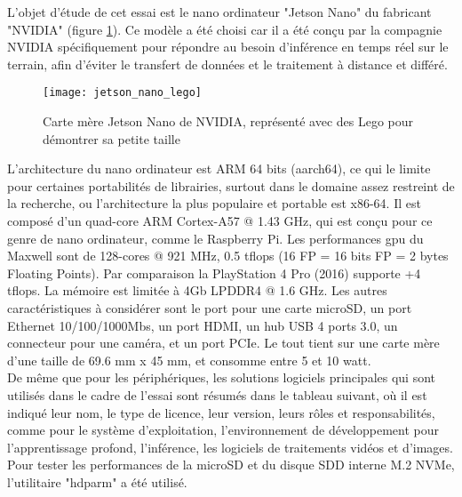 ﻿
\noindent L'objet d'étude de cet essai est le nano ordinateur "Jetson Nano" du fabricant "NVIDIA" (figure \ref{fig:jetson_nano_lego}). Ce modèle a été choisi car il a été conçu par la compagnie NVIDIA spécifiquement pour répondre au besoin d'inférence en temps réel sur le terrain, afin d'éviter le transfert de données et le traitement à distance et différé. 
\begin{figure}[H]
    \centering
    \texttt{[image: jetson\_nano\_lego]}
    \caption[Carte mère Jetson Nano de NVIDIA]{Carte mère Jetson Nano de NVIDIA, représenté avec des Lego pour démontrer sa petite taille}
    \label{fig:jetson_nano_lego}
\end{figure}
\noindent L'architecture du nano ordinateur est ARM 64 bits (aarch64), ce qui le limite pour certaines portabilités de librairies, surtout dans le domaine assez restreint de la recherche, ou l'architecture la plus populaire et portable est x86-64. Il est composé d'un quad-core ARM Cortex-A57 @ 1.43 GHz, qui est conçu pour ce genre de nano ordinateur, comme le Raspberry Pi. Les performances \acrshort{gpu} du Maxwell sont de 128-cores @ 921 MHz, 0.5 \acrshort{tflops} (16 FP = 16 bits FP = 2 bytes Floating Points). Par comparaison la PlayStation 4 Pro (2016) supporte +4 \acrshort{tflops}. La mémoire est limitée à 4Gb LPDDR4 @ 1.6 GHz. Les autres caractéristiques à considérer sont le port pour une carte microSD, un port Ethernet 10/100/1000Mbs, un port HDMI, un hub USB 4 ports 3.0, un connecteur pour une caméra, et un port PCIe. Le tout tient sur une carte mère d'une taille de 69.6 mm x 45 mm, et consomme entre 5 et 10 watt.
\vspace{\baselineskip}
\\
\noindent De même que pour les périphériques, les solutions logiciels principales qui sont utilisés dans le cadre de l'essai sont résumés dans le tableau suivant, où il est indiqué leur nom, le type de licence, leur version, leurs rôles et responsabilités, comme pour le système d'exploitation, l'environnement de développement pour l'apprentissage profond, l'inférence, les logiciels de traitements vidéos et d'images. 
\vspace{\baselineskip}
\\
\noindent Pour tester les performances de la microSD et du disque SDD interne M.2 NVMe, l'utilitaire "hdparm" a été utilisé. 
\vspace{\baselineskip}
\\
